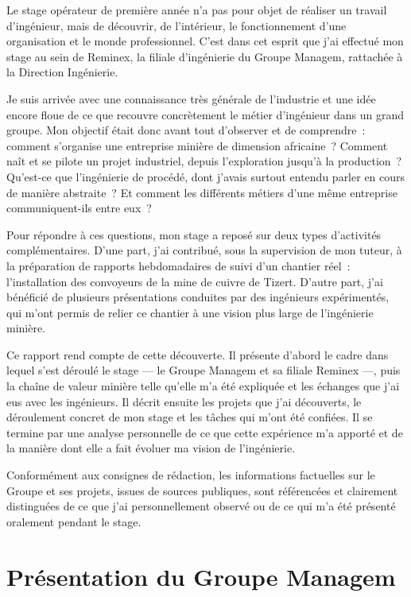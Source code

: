 \documentclass[12pt,a4paper,oneside]{report}
\begin{document}
Le stage opérateur de première année n'a pas pour objet de réaliser un travail d'ingénieur, mais de découvrir, de l'intérieur, le fonctionnement d'une organisation et le monde professionnel. C'est dans cet esprit que j'ai effectué mon stage au sein de Reminex, la filiale d'ingénierie du Groupe Managem, rattachée à la Direction Ingénierie.

Je suis arrivée avec une connaissance très générale de l'industrie et une idée encore floue de ce que recouvre concrètement le métier d'ingénieur dans un grand groupe. Mon objectif était donc avant tout d'observer et de comprendre~: comment s'organise une entreprise minière de dimension africaine~? Comment naît et se pilote un projet industriel, depuis l'exploration jusqu'à la production~? Qu'est-ce que l'ingénierie de procédé, dont j'avais surtout entendu parler en cours de manière abstraite~? Et comment les différents métiers d'une même entreprise communiquent-ils entre eux~?

Pour répondre à ces questions, mon stage a reposé sur deux types d'activités complémentaires. D'une part, j'ai contribué, sous la supervision de mon tuteur, à la préparation de rapports hebdomadaires de suivi d'un chantier réel~: l'installation des convoyeurs de la mine de cuivre de Tizert. D'autre part, j'ai bénéficié de plusieurs présentations conduites par des ingénieurs expérimentés, qui m'ont permis de relier ce chantier à une vision plus large de l'ingénierie minière.

Ce rapport rend compte de cette découverte. Il présente d'abord le cadre dans lequel s'est déroulé le stage --- le Groupe Managem et sa filiale Reminex ---, puis la chaîne de valeur minière telle qu'elle m'a été expliquée et les échanges que j'ai eus avec les ingénieurs. Il décrit ensuite les projets que j'ai découverts, le déroulement concret de mon stage et les tâches qui m'ont été confiées. Il se termine par une analyse personnelle de ce que cette expérience m'a apporté et de la manière dont elle a fait évoluer ma vision de l'ingénierie.

Conformément aux consignes de rédaction, les informations factuelles sur le Groupe et ses projets, issues de sources publiques, sont référencées et clairement distinguées de ce que j'ai personnellement observé ou de ce qui m'a été présenté oralement pendant le stage.
\chapter{Présentation du Groupe Managem}
\end{document}
